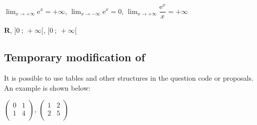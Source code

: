 \begin{minipage}[c][][t]{.6\linewidth}
\begin{alterqcm}[lq=5cm]
{%
{$\displaystyle\lim_{x \to +\infty} \text{e}^x = + \infty$},%
{$\displaystyle\lim_{x \to -\infty} \text{e}^x = 0$},%
{$\displaystyle\lim_{x \to +\infty} \dfrac{\text{e}^x}{x} = + \infty$}%
}

{%
{$\mathbf{R}$},%
{$\big]0~;~+ \infty\big[$},%
{$\big[0~;~+\infty\big[$}%
}\end{alterqcm}
\end{minipage}
%

\subsection{Temporary modification of }
 It is possible to use tables and other structures in the question code or proposals. An example is shown below:
 \newlength{\oldtextwidth}
\tkzHandBomb\ \begin{tkzltxexample}[small]
  \newlength{\oldtextwidth}
\end{tkzltxexample}

\medskip
  \setlength{\oldtextwidth}{\textwidth}
  \setlength{\textwidth}{14cm}
\begin{alterqcm}[language=english,lq=88mm,symb=$\Box$]
{%
{\(\begin{pmatrix}
        0 & 1 \\
        1 & 4 \\
\end{pmatrix}\)},%
{\(\begin{pmatrix}
        1 & 2 \\
        2 & 5 \\
 \end{pmatrix}\)}
}
\end{alterqcm}
\setlength{\textwidth}{\oldtextwidth}

